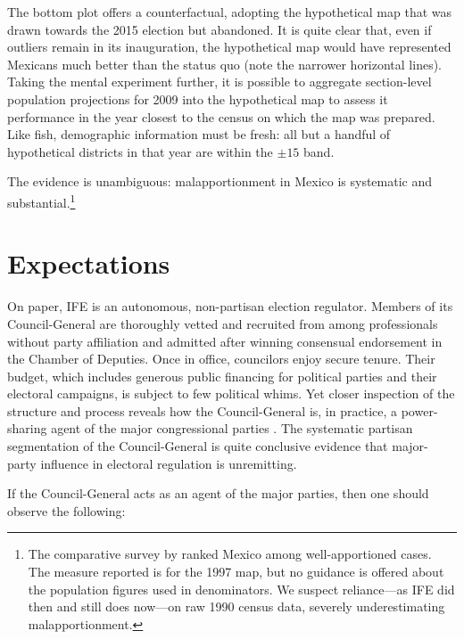 \documentclass[letter,12pt]{article}
\begin{document}
The bottom plot offers a counterfactual, adopting the hypothetical map that was drawn towards the 2015 election but abandoned. It is quite clear that, even if outliers remain in its inauguration, the hypothetical map would have represented Mexicans much better than the status quo (note the narrower horizontal lines). Taking the mental experiment further, it is possible to aggregate section-level population projections for 2009 into the hypothetical map to assess it performance in the year closest to the census on which the map was prepared. Like fish, demographic information must be fresh: all but a handful of hypothetical districts in that year are within the $\pm15$ band. 

The evidence is unambiguous: malapportionment in Mexico is systematic and substantial.\footnote{The comparative survey by \citet{snyder.samuelsMalapp2004} ranked Mexico among well-apportioned cases. The measure reported is for the 1997 map, but no guidance is offered about the population figures used in denominators. We suspect reliance---as IFE did then and still does now---on raw 1990 census data, severely underestimating malapportionment.} %

\section{Expectations}

On paper, IFE is an autonomous, non-partisan election regulator. Members of its Council-General are thoroughly vetted and recruited from among professionals without party affiliation and admitted after winning consensual endorsement in the Chamber of Deputies. Once in office, councilors enjoy secure tenure. Their budget, which includes generous public financing for political parties and their electoral campaigns, is subject to few political whims. Yet closer inspection of the structure and process reveals how the Council-General is, in practice, a power-sharing agent of the major congressional parties \citep{estevez.magar.rosas.2008}. The systematic partisan segmentation of the Council-General is quite conclusive evidence that major-party influence in electoral regulation is unremitting. 

If the Council-General acts as an agent of the major parties, then one should observe the following: 
\end{document}
